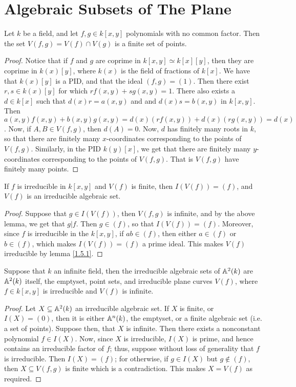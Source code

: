 \section{Algebraic Subsets of The Plane}

\begin{lemma}\label{1.6.1}
    Let $k$ be a field, and let $f,g \in k[x,y]$ polynomials with no common
    factor. Then the set $V(f,g)=V(f) \cap V(g)$ is a finite set of points.
\end{lemma}
\begin{proof}
    Notice that if $f$ and $g$ are coprime in $k[x,y] \simeq k[x][y]$, then they
    are coprime in $k(x)[y]$, where $k(x)$ is the field of fractions of $k[x]$.
    We have that $k(x)[y]$ is a PID, and that the ideal $(f,g)=(1)$. Then there
    exist $r,s \in k(x)[y]$ for which $rf(x,y)+sg(x,y)=1$. There also exists a
    $d \in k[x]$ such that $d(x)r=a(x,y)$ and and $d(x)s=b(x,y)$ in $k[x,y]$.
    Then $a(x,y)f(x,y)+b(x,y)g(x,y)=d(x)(rf(x,y))+d(x)(rg(x,y))=d(x)$. Now, if
    $A,B \in V(f,g)$, then $d(A)=0$. Now, $d$ has finitely many roots in $k$, so
    that there are finitely many $x$-coordinates corresponding to the points of
    $V(f,g)$. Similarly, in the PID $k(y)[x]$, we get that there are finitely
    many $y$-coordinates corresponding to the points of $V(f,g)$. That is
    $V(f,g)$ have finitely many points.
\end{proof}
\begin{corollary}
    If $f$ is irreducible in $k[x,y]$ and $V(f)$ is finite, then $I(V(f))=(f)$,
    and $V(f)$ is an irreducible algebraic set.
\end{corollary}
\begin{proof}
    Suppose that $g \in I(V(f))$, then $V(f,g)$ is infinite, and by the above
    lemma, we get that $g|f$. Then $g \in (f)$, so that $I(V(f))=(f)$. Moreover,
    since $f$ is irreducible in the $k[x,y]$, if $ab \in (f)$, then either $a
    \in (f)$ or $b \in (f)$, which makes $I(V(f))=(f)$ a prime ideal. This makes
    $V(f)$ irreducible by lemma \ref{1.5.1}.
\end{proof}
\begin{corollary}
    Suppose that $k$ an infinite field, then the irreducible algebraic sets of
    $\mathbb{A}^2(k)$ are $\mathbb{A}^2(k)$ itself, the emptyset, point sets, and irreducible
    plane curves $V(f)$, where $f \in k[x,y]$ is irreducible and $V(f)$ is
    infinite.
\end{corollary}
\begin{proof}
    Let $X \subseteq \mathbb{A}^2(k)$ an irreducible algebraic set. If $X$ is finite, or
    $I(X)=(0)$, then it is either $\mathbb{A}^n(k)$, the emptyset, or a finite algebraic
    set (i.e. a set of points). Suppose then, that $X$ is infinite. Then there
    exists a nonconstant polynomial $f \in I(X)$. Now, since $X$ is irreducible,
    $I(X)$ is prime, and hence contains an irreducible factor of $f$; thus,
    suppose without loss of generality that $f$ is irreducible. Then $I(X)=(f)$;
    for otherwise, if $g \in I(X)$ but $g \not\in (f)$, then $X \subseteq
    V(f,g)$ is finite which is a contradiction. This makes $X=V(f)$ as required.
\end{proof}
